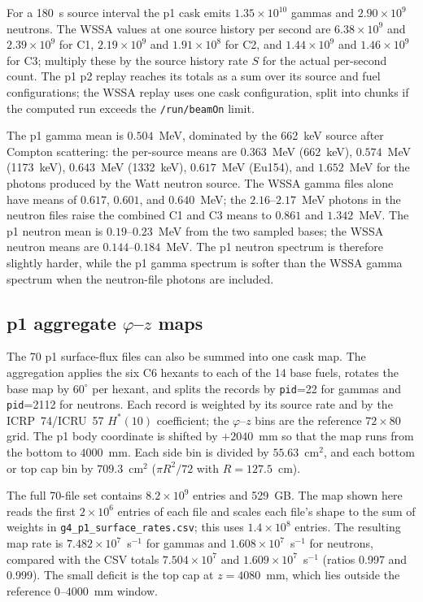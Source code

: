\documentclass[11pt,a4paper]{article}
\begin{document}
For a 180~s source interval the p1 cask emits $1.35\times10^{10}$ gammas and
$2.90\times10^{9}$ neutrons.  The WSSA values at one source history per second
are $6.38\times10^{9}$ and $2.39\times10^{9}$ for C1, $2.19\times10^{9}$ and
$1.91\times10^{8}$ for C2, and $1.44\times10^{9}$ and $1.46\times10^{9}$ for
C3; multiply these by the source history rate $S$ for the actual
per-second count.  The p1 p2 replay reaches its totals as a sum over its source
and fuel configurations; the WSSA replay uses one cask configuration, split
into chunks if the computed run exceeds the \texttt{/run/beamOn} limit.

The p1 gamma mean is $0.504$~MeV, dominated by the 662~keV source after
Compton scattering: the per-source means are $0.363$~MeV (662~keV),
$0.574$~MeV (1173~keV), $0.643$~MeV (1332~keV), $0.617$~MeV (Eu154), and
$1.652$~MeV for the photons produced by the Watt neutron source.  The WSSA
gamma files alone have means of $0.617$, $0.601$, and $0.640$~MeV; the
$2.16$--$2.17$~MeV photons in the neutron files raise the combined C1 and C3
means to $0.861$ and $1.342$~MeV.  The p1 neutron mean is $0.19$--$0.23$~MeV
from the two sampled bases; the WSSA neutron means are $0.144$--$0.184$~MeV.
The p1 neutron spectrum is therefore slightly harder, while the p1 gamma
spectrum is softer than the WSSA gamma spectrum when the neutron-file photons
are included.

\subsection{p1 aggregate $\varphi$--$z$ maps}\label{sec:p1_maps}

The 70 p1 surface-flux files can also be summed into one cask map.  The
aggregation applies the six C6 hexants to each of the 14 base fuels, rotates
the base map by $60^\circ$ per hexant, and splits the records by
\texttt{pid}=22 for gammas and \texttt{pid}=2112 for neutrons.  Each record is
weighted by its source rate and by the ICRP~74/ICRU~57 $H^*(10)$ coefficient;
the $\varphi$--$z$ bins are the reference $72\times80$ grid.  The p1 body
coordinate is shifted by $+2040$~mm so that the map runs from the bottom to
$4000$~mm.  Each side bin is divided by $55.63$~cm$^2$, and each bottom or
top cap bin by $709.3$~cm$^2$ ($\pi R^2/72$ with $R=127.5$~cm).

The full 70-file set contains $8.2\times10^9$ entries and 529~GB.  The map
shown here reads the first $2\times10^6$ entries of each file and scales each
file's shape to the sum of weights in
\texttt{g4\_p1\_surface\_rates.csv}; this uses $1.4\times10^8$ entries.  The
resulting map rate is $7.482\times10^7$~s$^{-1}$ for gammas and
$1.608\times10^7$~s$^{-1}$ for neutrons, compared with the CSV totals
$7.504\times10^7$ and $1.609\times10^7$~s$^{-1}$ (ratios 0.997 and 0.999).
The small deficit is the top cap at $z=4080$~mm, which lies outside the
reference $0$--$4000$~mm window.
\end{document}
